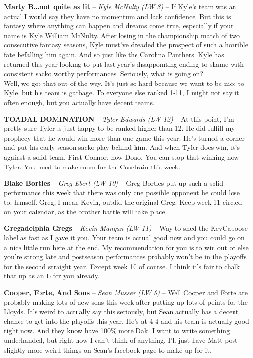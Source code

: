 \documentclass[11pt,letterpaper]{article}
\begin{document}
\newpage
{}
\begin{etaremune}
\item \textbf{Marty B\dots not quite as lit} -- \textit{Kyle McNulty (LW 8)} -- If Kyle's team was an actual I would say they have no momentum and lack confidence. But this is fantasy where anything can happen and dreams come true, especially if your name is Kyle William McNulty. After losing in the championship match of two consecutive fantasy seasons, Kyle must've dreaded the prospect of such a horrible fate befalling him again. And so just like the Carolina Panthers, Kyle has returned this year looking to put last year's disappointing ending to shame with consistent sacko worthy performances. Seriously, what is going on?   
\\[2mm]Well, we got that out of the way. It's just so hard because we want to be nice to Kyle, but his team is garbage. To everyone else ranked 1-11, I might not say it often enough, but you actually have decent teams. 
\item \textbf{TOADAL DOMINATION} -- \textit{Tyler Edwards (LW 12)} -- At this point, I'm pretty sure Tyler is just happy to be ranked higher than 12. He did fulfill my prophecy that he would win more than one game this year. He's turned a corner and put his early season sacko-play behind him. And when Tyler does win, it's against a solid team. First Connor, now Dono. You can stop that winning now Tyler. You need to make room for the Casetrain this week.
\item \textbf{Blake Bortles} -- \textit{Greg Ebert (LW 10)} -- Greg Bortles put up such a solid performance this week that there was only one possible opponent he could lose to: himself. Greg, I mean Kevin, outdid the original Greg. Keep week 11 circled on your calendar, as the brother battle will take place. 
\item \textbf{Gregadelphia Gregs} -- \textit{Kevin Mangan (LW 11)} -- Way to shed the KevCaboose label as fast as I gave it you. Your team is actual good now and you could go on a nice little run here at the end. My recommendation for you is to win out or else you're strong late and postseason performances probably won't be in the playoffs for the second straight year. Except week 10 of course. I think it's fair to chalk that up as an L for you already.
\item \textbf{Cooper, Forte, And Sons} -- \textit{Sean Musser (LW 8)} -- Well Cooper and Forte are probably making lots of new sons this week after putting up lots of points for the Lloyds. It's weird to actually say this seriously, but Sean actually has a decent chance to get into the playoffs this year. He's at 4-4 and his team is actually good right now. And they know have 100\% more Dak. I want to write something underhanded, but right now I can't think of anything. I'll just have Matt post slightly more weird things on Sean's facebook page to make up for it. 

\end{etaremune}
\end{document}
